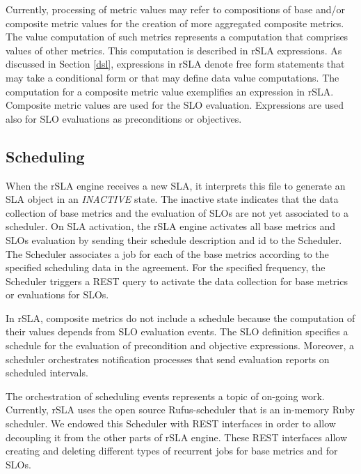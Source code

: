 Currently, processing of metric values may refer to compositions of base and/or composite metric values  for the creation of more aggregated 
composite metrics. %
The value computation of such metrics represents a computation that comprises values of other metrics. This computation is described in rSLA expressions.
As discussed in Section \ref{dsl}, expressions in rSLA denote free form statements that may take a conditional form or that may define data value computations. The computation for 
a composite metric value exemplifies an expression in rSLA. Composite metric values are used for the SLO evaluation. Expressions are used also for SLO evaluations as preconditions 
or objectives.


\subsection{Scheduling}\label{schedule}


When the rSLA engine receives a new SLA, it interprets this file to generate an SLA object in an \emph{INACTIVE} state. The inactive state indicates that 
the data collection of base metrics and the evaluation of SLOs are not yet associated to a scheduler. On SLA activation, the rSLA engine activates all base metrics and SLOs 
evaluation by sending their schedule description and id to the Scheduler. The Scheduler associates a job for each of the base metrics according to the specified scheduling data 
in the agreement. For the specified frequency, the Scheduler triggers a REST query to activate the data collection for base metrics or evaluations for SLOs. 

In rSLA, composite metrics do not include a schedule because the computation of their values depends from SLO evaluation events. The SLO definition specifies a schedule for the 
evaluation of precondition and objective expressions. Moreover, a scheduler orchestrates notification processes that send evaluation reports on scheduled intervals.

The orchestration of scheduling events represents a topic of on-going work. Currently, rSLA uses the open source Rufus-scheduler that is an in-memory Ruby scheduler. We endowed 
this Scheduler with REST interfaces in order to allow decoupling it from the other parts of rSLA engine. These REST interfaces allow creating and deleting different types of 
recurrent jobs for base metrics and for SLOs. 

